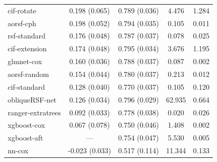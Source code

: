 \documentclass{article}\usepackage[]{graphicx}\usepackage[]{xcolor}
\newenvironment{knitrout}{}{} %
\begin{document}
\begin{knitrout}
\begin{longtable}[t]{lcccc}
\hspace{1em}cif-rotate & 0.198 (0.065) & 0.789 (0.036) & 4.476 & 1.284\\
\hspace{1em}aorsf-cph & 0.198 (0.052) & 0.794 (0.035) & 0.105 & 0.011\\
\hspace{1em}rsf-standard & 0.176 (0.048) & 0.787 (0.037) & 0.078 & 0.025\\
\hspace{1em}cif-extension & 0.174 (0.048) & 0.795 (0.034) & 3.676 & 1.195\\
\hspace{1em}glmnet-cox & 0.160 (0.036) & 0.788 (0.037) & 0.087 & 0.002\\
\hspace{1em}aorsf-random & 0.154 (0.044) & 0.780 (0.037) & 0.213 & 0.012\\
\hspace{1em}cif-standard & 0.128 (0.040) & 0.770 (0.037) & 0.105 & 0.120\\
\hspace{1em}obliqueRSF-net & 0.126 (0.034) & 0.796 (0.029) & 62.935 & 0.664\\
\hspace{1em}ranger-extratrees & 0.092 (0.033) & 0.778 (0.038) & 0.020 & 0.026\\
\hspace{1em}xgboost-cox & 0.067 (0.078) & 0.750 (0.046) & 1.408 & 0.002\\
\hspace{1em}xgboost-aft & --- & 0.754 (0.047) & 5.530 & 0.005\\
\hspace{1em}nn-cox & -0.023 (0.033) & 0.517 (0.114) & 11.344 & 0.133\\*
\end{longtable}

\end{knitrout}
\end{document}
